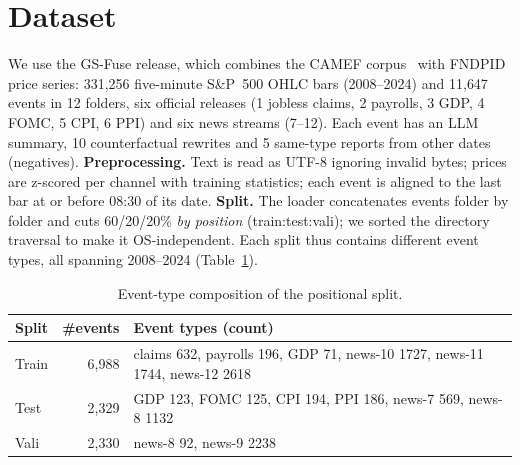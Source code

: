 \documentclass{article}
\begin{document}
\section{Dataset}
We use the GS-Fuse release, which combines the CAMEF corpus~\cite{camef} with FNDPID price series: 331{,}256 five-minute S\&P~500 OHLC bars (2008--2024) and 11{,}647 events in 12 folders, six official releases (1 jobless claims, 2 payrolls, 3 GDP, 4 FOMC, 5 CPI, 6 PPI) and six news streams (7--12). Each event has an LLM summary, 10 counterfactual rewrites and 5 same-type reports from other dates (negatives).
\textbf{Preprocessing.} Text is read as UTF-8 ignoring invalid bytes; prices are z-scored per channel with training statistics; each event is aligned to the last bar at or before 08:30 of its date.
\textbf{Split.} The loader concatenates events folder by folder and cuts 60/20/20\% \emph{by position} (train:test:vali); we sorted the directory traversal to make it OS-independent. Each split thus contains different event types, all spanning 2008--2024 (Table~\ref{tab:split}).

\begin{table}[t]
\caption{Event-type composition of the positional split.}
\label{tab:split}
\centering\small
\begin{tabular}{lrl}
\toprule
Split & \#events & Event types (count) \\
\midrule
Train & 6{,}988 & claims 632, payrolls 196, GDP 71, news-10 1727, news-11 1744, news-12 2618 \\
Test  & 2{,}329 & GDP 123, FOMC 125, CPI 194, PPI 186, news-7 569, news-8 1132 \\
Vali  & 2{,}330 & news-8 92, news-9 2238 \\
\bottomrule
\end{tabular}
\end{table}

\end{document}

